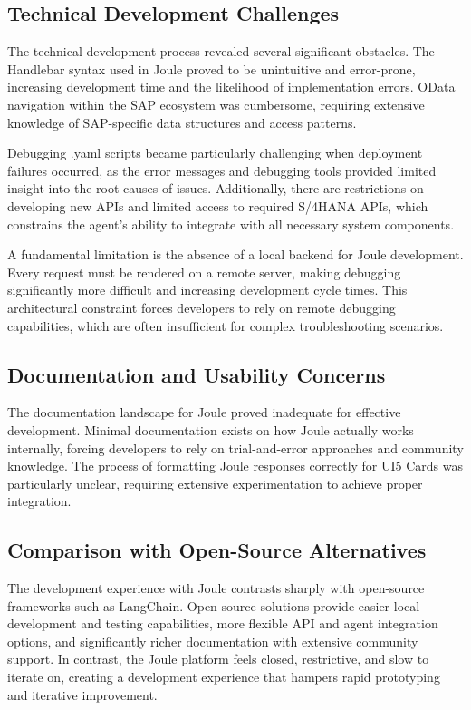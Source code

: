 \subsection{Technical Development Challenges}

The technical development process revealed several significant obstacles. The Handlebar syntax used in Joule proved to be unintuitive and error-prone, increasing development time and the likelihood of implementation errors. OData navigation within the SAP ecosystem was cumbersome, requiring extensive knowledge of SAP-specific data structures and access patterns.

Debugging .yaml scripts became particularly challenging when deployment failures occurred, as the error messages and debugging tools provided limited insight into the root causes of issues. Additionally, there are restrictions on developing new APIs and limited access to required S/4HANA APIs, which constrains the agent's ability to integrate with all necessary system components.

A fundamental limitation is the absence of a local backend for Joule development. Every request must be rendered on a remote server, making debugging significantly more difficult and increasing development cycle times. This architectural constraint forces developers to rely on remote debugging capabilities, which are often insufficient for complex troubleshooting scenarios.

\subsection{Documentation and Usability Concerns}

The documentation landscape for Joule proved inadequate for effective development. Minimal documentation exists on how Joule actually works internally, forcing developers to rely on trial-and-error approaches and community knowledge. The process of formatting Joule responses correctly for UI5 Cards was particularly unclear, requiring extensive experimentation to achieve proper integration.

\subsection{Comparison with Open-Source Alternatives}

The development experience with Joule contrasts sharply with open-source frameworks such as LangChain. Open-source solutions provide easier local development and testing capabilities, more flexible API and agent integration options, and significantly richer documentation with extensive community support. In contrast, the Joule platform feels closed, restrictive, and slow to iterate on, creating a development experience that hampers rapid prototyping and iterative improvement.


